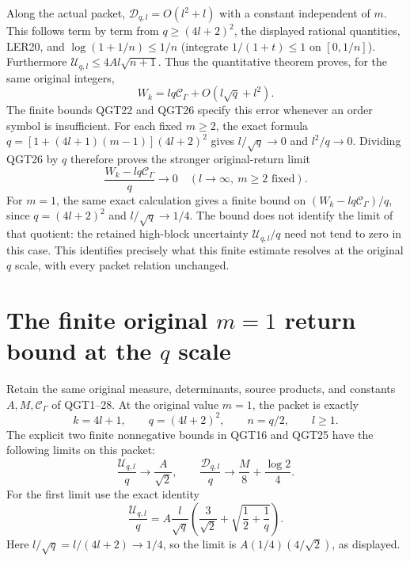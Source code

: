 \documentclass[11pt,a4paper]{article}
\begin{document}
Along the actual packet, $\mathcal D_{q,l}=O(l^2+l)$ with a constant
independent of $m$. This follows term by term from
$q\ge(4l+2)^2$, the displayed rational quantities, LER20, and
$\log(1+1/n)\le1/n$ (integrate $1/(1+t)\le1$ on $[0,1/n]$).
Furthermore $\mathcal U_{q,l}\le4Al\sqrt{n+1}$.
Thus the quantitative theorem proves, for the same original integers,
\[
 \boxed{W_k=lq\mathcal C_\Gamma+O(l\sqrt q+l^2).}
 \tag{QGT27}
\]
The finite bounds QGT22 and QGT26 specify this error whenever an
order symbol is insufficient.
For each fixed $m\ge2$, the exact formula
$q=[1+(4l+1)(m-1)](4l+2)^2$ gives
$l/\sqrt q\to0$ and $l^2/q\to0$. Dividing QGT26 by $q$ therefore
proves the stronger original-return limit
\[
 \boxed{\frac{W_k-lq\mathcal C_\Gamma}{q}\longrightarrow0
                        \quad(l\to\infty,\ m\ge2\text{ fixed}).}
 \tag{QGT28}
\]
For $m=1$, the same exact calculation gives a finite bound on
$(W_k-lq\mathcal C_\Gamma)/q$, since $q=(4l+2)^2$ and
$l/\sqrt q\to1/4$. The bound does not identify the limit of that
quotient: the retained high-block uncertainty
$\mathcal U_{q,l}/q$ need not tend to zero in this case.
This identifies precisely what this finite estimate resolves at the
original $q$ scale, with every packet relation unchanged.


\clearpage

\section{The finite original \(m=1\) return bound at the \(q\) scale}
\label{sec:QGQ}

Retain the same original measure, determinants, source products, and
constants $A,M,\mathcal C_\Gamma$ of QGT1--28. At the original value
$m=1$, the packet is exactly
\[
 k=4l+1,\qquad q=(4l+2)^2,\qquad n=q/2,\qquad l\ge1.
 \tag{QGQ1}
\]
The explicit two finite nonnegative bounds in QGT16 and QGT25 have
the following limits on this packet:
\[
 \frac{\mathcal U_{q,l}}q\longrightarrow\frac A{\sqrt2},
 \qquad
 \frac{\mathcal D_{q,l}}q\longrightarrow
                  \frac M8+\frac{\log2}{4}.
 \tag{QGQ2}
\]
For the first limit use the exact identity
\[
 \frac{\mathcal U_{q,l}}q
 = A\frac l{\sqrt q}
          \left(\frac3{\sqrt2}+\sqrt{\frac12+\frac1q}\right).
\]
Here $l/\sqrt q=l/(4l+2)\to1/4$, so the limit is
$A(1/4)(4/\sqrt2)$, as displayed.
\end{document}
